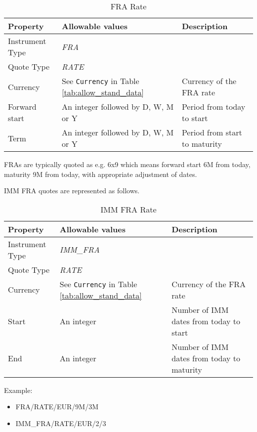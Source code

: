 \begin{table}[H]
\centering
  \begin{tabular}{|p{3.5cm}|p{3.5cm}|p{6.5cm}|}
  \hline
    {\bf Property} & {\bf Allowable values} & {\bf Description} \\ \hline
    Instrument Type & \emph{FRA} & \\ \hline
    Quote Type & \emph{RATE} & \\ \hline
    Currency & See \lstinline!Currency! in Table \ref{tab:allow_stand_data} & Currency of the FRA rate\\ \hline
    Forward start & An integer followed by D, W, M or Y  & Period from today to start  \\ \hline
    Term & An integer followed by D, W, M or Y & Period from start to maturity\\ \hline
  \end{tabular}
  \caption{FRA Rate}
  \label{tab:fra_quote}
\end{table}
FRAs are typically quoted as e.g. 6x9 which means forward start 6M from today, maturity 9M from today, with appropriate
adjustment of dates. 

\medskip 
IMM FRA quotes are represented as follows.

\begin{table}[H]
\centering
  \begin{tabular}{|p{3.5cm}|p{3.5cm}|p{6.5cm}|}
  \hline
    {\bf Property} & {\bf Allowable values} & {\bf Description} \\ \hline
    Instrument Type & \emph{IMM\_FRA} & \\ \hline
    Quote Type & \emph{RATE} & \\ \hline
    Currency & See \lstinline!Currency! in Table \ref{tab:allow_stand_data} & Currency of the FRA rate\\ \hline
    Start & An integer & Number of IMM dates from today to start  \\ \hline
    End & An integer & Number of IMM dates from today to maturity\\ \hline
  \end{tabular}
  \caption{IMM FRA Rate}
  \label{tab:imm_fra_quote}
\end{table}

\medskip
Example:
\begin{itemize}
\item {FRA/RATE/EUR/9M/3M}
\item {IMM\_FRA/RATE/EUR/2/3}
\end{itemize}




